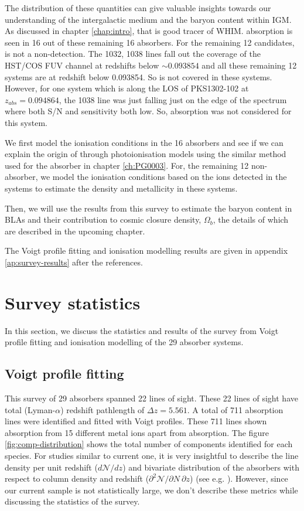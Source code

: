 The distribution of these quantities can give valuable insights towards our understanding of the intergalactic medium and the baryon content within IGM. As discussed in chapter \ref{chap:intro}, that  is good tracer of WHIM.  absorption is seen in 16 out of these remaining 16 absorbers. For the remaining 12 candidates,  is not a non-detection. The  1032, 1038 lines fall out the coverage of the HST/COS FUV channel at redshifts below $\sim 0.093854$ and all these remaining 12 systems are at redshift below 0.093854. So  is not covered in these systems. However, for one system which is along the LOS of PKS1302-102 at $z_{abs}=0.094864$, the  1038 line was just falling just on the edge of the spectrum where both S/N and sensitivity both low. So,  absorption was not considered for this system. 

We first model the ionisation conditions in the 16  absorbers and see if we can explain the origin of  through photoionisation models using the similar method used for the absorber in chapter \ref{ch:PG0003}. For, the remaining 12 non- absorber, we model the ionisation conditions based on the ions detected in the systems to estimate the density and metallicity in these systems. 

Then, we will use the results from this survey to estimate the baryon content in BLAs and their contribution to cosmic closure density, $\Omega_b$, the details of which are described in the upcoming chapter.

The Voigt profile fitting and ionisation modelling results are given in appendix \ref{ap:survey-results} after the references.


\section{Survey statistics}

In this section, we discuss the statistics and results of the survey from Voigt profile fitting and ionisation modelling of the 29 absorber systems.

\subsection{Voigt profile fitting}

This survey of 29 absorbers spanned 22 lines of sight. These 22 lines of sight have total  (Lyman-$\alpha$) redshift pathlength of $\Delta z = 5.561$. A total of 711 absorption lines were identified and fitted with Voigt profiles. These 711 lines shown absorption from 15 different metal ions apart from  absorption. The figure \ref{fig:comp-distribution} shows the total number of components identified for each species. For studies similar to current one, it is very insightful to describe the line density per unit redshift ($d\mathcal{N}/dz$) and  bivariate distribution of the absorbers with respect to column density and redshift ($\partial ^2 \mathcal{N}/\partial N \ \partial z $) (see e.g. \citet{danforth-2016, Penton-2000, tilton_2012}). However, since our current sample is not statistically large, we don't describe these metrics while discussing the statistics of the survey.

